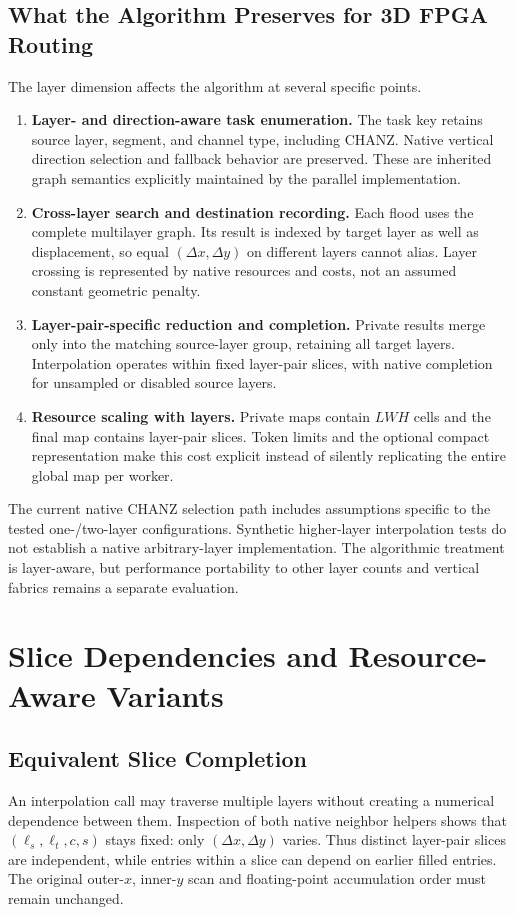 \documentclass[conference,10pt,letterpaper]{IEEEtran}
\begin{document}
\subsection{What the Algorithm Preserves for 3D FPGA Routing}
The layer dimension affects the algorithm at several specific points.
\begin{enumerate}
\item \textbf{Layer- and direction-aware task enumeration.} The task key retains source layer, segment, and channel type, including CHANZ. Native vertical direction selection and fallback behavior are preserved. These are inherited graph semantics explicitly maintained by the parallel implementation.
\item \textbf{Cross-layer search and destination recording.} Each flood uses the complete multilayer graph. Its result is indexed by target layer as well as displacement, so equal $(\Delta x,\Delta y)$ on different layers cannot alias. Layer crossing is represented by native resources and costs, not an assumed constant geometric penalty.
\item \textbf{Layer-pair-specific reduction and completion.} Private results merge only into the matching source-layer group, retaining all target layers. Interpolation operates within fixed layer-pair slices, with native completion for unsampled or disabled source layers.
\item \textbf{Resource scaling with layers.} Private maps contain $LWH$ cells and the final map contains layer-pair slices. Token limits and the optional compact representation make this cost explicit instead of silently replicating the entire global map per worker.
\end{enumerate}
The current native CHANZ selection path includes assumptions specific to the tested one-/two-layer configurations. Synthetic higher-layer interpolation tests do not establish a native arbitrary-layer implementation. The algorithmic treatment is layer-aware, but performance portability to other layer counts and vertical fabrics remains a separate evaluation.

\section{Slice Dependencies and Resource-Aware Variants}
\subsection{Equivalent Slice Completion}
An interpolation call may traverse multiple layers without creating a numerical dependence between them. Inspection of both native neighbor helpers shows that $(\ell_s,\ell_t,c,s)$ stays fixed: only $(\Delta x,\Delta y)$ varies. Thus distinct layer-pair slices are independent, while entries within a slice can depend on earlier filled entries. The original outer-$x$, inner-$y$ scan and floating-point accumulation order must remain unchanged.
\end{document}
